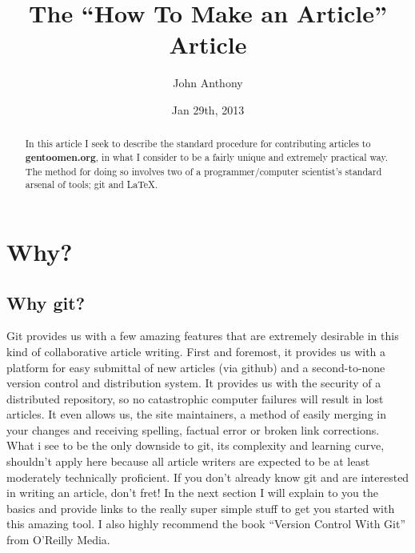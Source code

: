 \documentclass{amsart}
\begin{document}
\begin{abstract}
  In this article I seek to describe the standard procedure for contributing articles to \textbf{gentoomen.org}, in what I consider to be a fairly unique and extremely practical way. The method for doing so involves two of a programmer/computer scientist's standard arsenal of tools; git and \LaTeX{}.
\end{abstract}
        
\title{The ``How To Make an Article'' Article}
\author{John Anthony}
\date{Jan 29th, 2013}
\maketitle

\section{Why?}
\subsection{Why git?}
  Git provides us with a few amazing features that are extremely desirable in this kind of collaborative article writing. First and foremost, it provides us with a platform for easy submittal of new articles (via github) and a second-to-none version control and distribution system. It provides us with the security of a distributed repository, so no catastrophic computer failures will result in lost articles. It even allows us, the site maintainers, a method of easily merging in your changes and receiving spelling, factual error or broken link corrections. \\
  What i see to be the only downside to git, its complexity and learning curve, shouldn't apply here because all article writers are expected to be at least moderately technically proficient. If you don't already know git and are interested in writing an article, don't fret! In the next section I will explain to you the basics and provide links to the really super simple stuff to get you started with this amazing tool. I also highly recommend the book ``Version Control With Git'' from O'Reilly Media.
\end{document}
